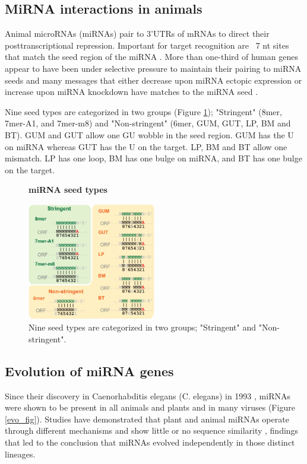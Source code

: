 \subsection{MiRNA interactions in animals}
Animal microRNAs (miRNAs) pair to 3'UTRs of mRNAs to direct their posttranscriptional repression. Important for target recognition are ~7 nt sites that match the seed region of the miRNA \cite{GRIMSON200791}. More than one-third of human genes appear to have been under selective pressure to maintain their pairing to miRNA seeds \cite {LEWIS200515} and many messages that either decrease upon miRNA ectopic expression or increase upon miRNA knockdown have matches to the miRNA seed \cite{Krutzfeldt2005, Lim2005}.

Nine seed types are categorized in two groups (Figure \ref{fig:mirnaseedtypes}); "Stringent" (8mer, 7mer-A1, and 7mer-m8) and "Non-stringent" (6mer, GUM, GUT, LP, BM and BT). GUM and GUT allow one GU wobble in the seed region. GUM has the U on miRNA whereas GUT has the U on the target. LP, BM and BT allow one mismatch. LP has one loop, BM has one bulge on miRNA, and BT has one bulge on the target.


\begin{figure}[ht!]
	  \centering
	  	\caption{\textbf{miRNA seed types}}
	  	\label{fig:mirnaseedtypes}
    \includegraphics[width=0.5\textwidth]{background figures/miRNA-seed-types-Nine-seed-types-are-categorized-in-two-groups-Stringent-8mer.png}
    	\caption*{Nine seed types are categorized in two groups; "Stringent" and "Non-stringent". \cite{seedarticle}}
\end{figure}



\subsection{Evolution of miRNA genes}
Since their discovery in Caenorhabditis elegans (C. elegans) in 1993 \cite{LEE1993843}, miRNAs   were shown to be present in all animals and plants and in many viruses \cite{mirbase1} (Figure \ref{evo_fig}). Studies have demonstrated that plant and animal miRNAs operate through different mechanisms and show little or no sequence similarity \cite{moran2017evolutionary}, findings that led to the conclusion that miRNAs evolved independently in those distinct lineages.



